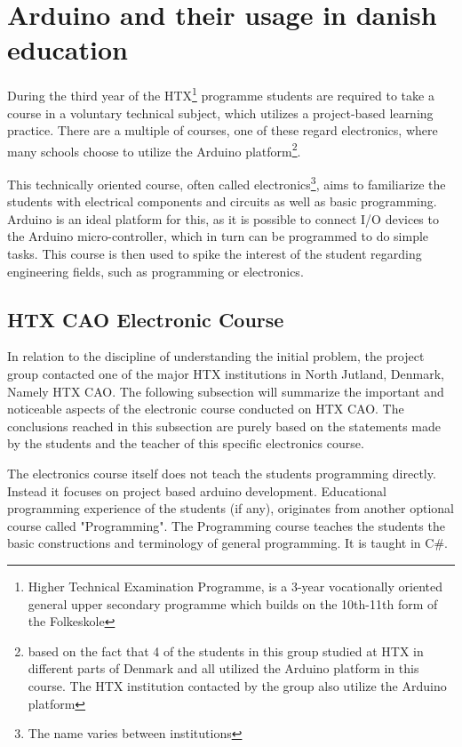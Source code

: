 
\section{Arduino and their usage in danish education}
During the third year of the HTX\footnote{Higher Technical Examination Programme, is a 3-year vocationally oriented general upper secondary programme which builds on the 10th-11th form of the Folkeskole\cite{htx_wiki}} programme students are required to take a course in a voluntary technical subject, which utilizes a project-based learning practice. 
There are a multiple of courses, one of these regard electronics, where many schools choose to utilize the Arduino platform\footnote{based on the fact that 4 of the students in this group studied at HTX in different parts of Denmark and all utilized the Arduino platform in this course. The HTX institution contacted by the group also utilize the Arduino platform}\cite{holstebro_education}.

This technically oriented course, often called electronics\footnote{The name varies between institutions}, aims to familiarize the students with electrical components and circuits as well as basic programming.\cite{holstebro_electronic}
Arduino is an ideal platform for this, as it is possible to connect I/O devices to the Arduino micro-controller, which in turn can be programmed to do simple tasks. 
This course is then used to spike the interest of the student regarding engineering fields, such as programming or electronics.

\subsection{HTX CAO Electronic Course}
In relation to the discipline of understanding the initial problem, the project group contacted one of the major HTX institutions in North Jutland, Denmark, Namely HTX CAO. The following subsection will summarize the important and noticeable aspects of the electronic course conducted on HTX CAO. The conclusions reached in this subsection are purely based on the statements made by the students and the teacher of this specific electronics course.

The electronics course itself does not teach the students programming directly. Instead it focuses on project based arduino development. Educational programming experience of the students (if any), originates from another optional course called "Programming". The Programming course teaches the students the basic constructions and terminology of general programming. It is taught in C{\#}. 

